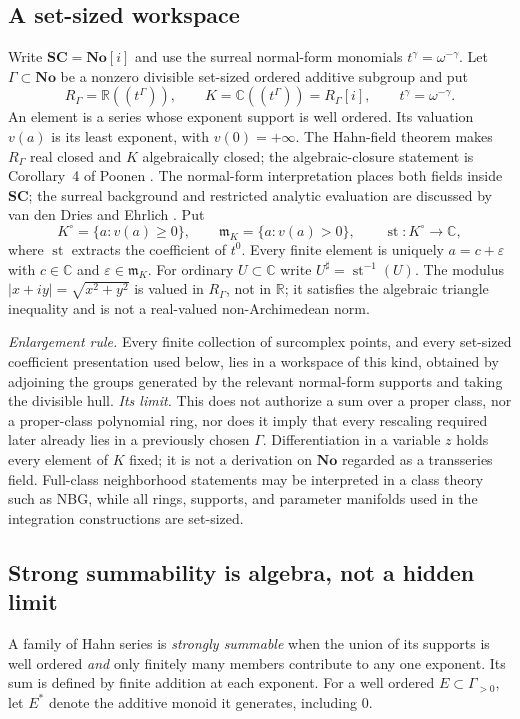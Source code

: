 \documentclass[11pt,letterpaper]{article}
\theoremstyle{definition}
\theoremstyle{remark}
\newcommand{\No}{\mathbf{No}}\newcommand{\SC}{\mathbf{SC}}
\newcommand{\R}{\mathbb R}\newcommand{\C}{\mathbb C}\newcommand{\Q}{\mathbb Q}
\newcommand{\m}{\mathfrak m}\newcommand{\st}{\operatorname{st}}
\newcommand{\sh}{^{\sharp}}\newcommand{\dd}{\,d}
\numberwithin{equation}{section}
\begin{document}
\subsection{A set-sized workspace}
Write $\SC=\No[i]$ and use the surreal normal-form monomials $t^\gamma=
\omega^{-\gamma}$. Let $\Gamma\subset\No$ be a nonzero divisible set-sized ordered
additive subgroup and put
\begin{equation}\label{contours:eq:fields}
  R_\Gamma=\R((t^\Gamma)),\qquad
  K=\C((t^\Gamma))=R_\Gamma[i],\qquad
  t^\gamma=\omega^{-\gamma}.
\end{equation}
An element is a series whose exponent support is well ordered. Its valuation
$v(a)$ is its least exponent, with $v(0)=+\infty$. The Hahn-field theorem makes
$R_\Gamma$ real closed and $K$ algebraically closed; the algebraic-closure
statement is Corollary~4 of Poonen \cite{Poonen}. The normal-form interpretation
places both fields inside $\SC$; the surreal background and restricted analytic
evaluation are discussed by van den Dries and Ehrlich \cite{vdDE}. Put
\[
  K^\circ=\{a:v(a)\ge0\},\qquad
  \m_K=\{a:v(a)>0\},\qquad
  \st:K^\circ\longrightarrow\C,
\]
where $\st$ extracts the coefficient of $t^0$. Every finite element is uniquely
$a=c+\varepsilon$ with $c\in\C$ and $\varepsilon\in\m_K$. For ordinary
$U\subset\C$ write $U\sh=\st^{-1}(U)$. The modulus $|x+iy|=\sqrt{x^2+y^2}$ is
valued in $R_\Gamma$, not in $\R$; it satisfies the algebraic triangle inequality
and is not a real-valued non-Archimedean norm.

\emph{Enlargement rule.} Every finite collection of surcomplex points, and every
set-sized coefficient presentation used below, lies in a workspace of this kind,
obtained by adjoining the groups generated by the relevant normal-form supports and
taking the divisible hull. \emph{Its limit.} This does not authorize a sum over a
proper class, nor a proper-class polynomial ring, nor does it imply that every
rescaling required later already lies in a previously chosen $\Gamma$.
Differentiation in a variable $z$ holds every element of $K$ fixed; it is not a
derivation on $\No$ regarded as a transseries field. Full-class neighborhood
statements may be interpreted in a class theory such as NBG, while all rings,
supports, and parameter manifolds used in the integration constructions are
set-sized.

\subsection{Strong summability is algebra, not a hidden limit}
\begin{definition}\label{contours:def:strongsum}
A family of Hahn series is \emph{strongly summable} when the union of its supports
is well ordered \emph{and} only finitely many members contribute to any one
exponent. Its sum is defined by finite addition at each exponent. For a well
ordered $E\subset\Gamma_{>0}$, let $E^*$ denote the additive monoid it generates,
including $0$.
\end{definition}
\end{document}
